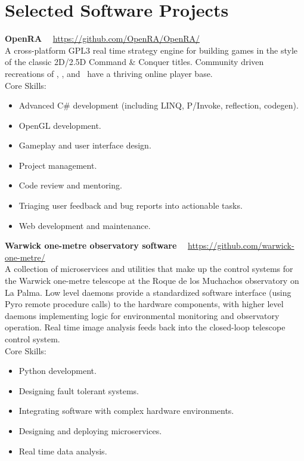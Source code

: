 \documentclass[print]{cv-style}
\begin{document}
\section{Selected Software Projects}

\parbox[t]{12.8cm}{%
    \textbf{OpenRA}%
    \hfill%
    {\small\color{lightgray} \faGithub~~\url{https://github.com/OpenRA/OpenRA/}}\\%
    A cross-platform GPL3 real time strategy engine for building games in the style of the classic 2D/2.5D Command \& Conquer titles.  Community driven recreations of , , and ~have a thriving online player base.
    \vspace{\parsep}\\
    Core Skills:
    \begin{itemize}
        \item Advanced C\# development (including LINQ, P/Invoke, reflection, codegen).
        \item OpenGL development.
        \item Gameplay and user interface design.
        \item Project management.
        \item Code review and mentoring.
        \item Triaging user feedback and bug reports into actionable tasks.
        \item Web development and maintenance.
    \end{itemize}
}

\parbox[t]{12.8cm}{%
    \textbf{Warwick one-metre observatory software}%
    \hfill%
    {\footnotesize\color{lightgray} \faGithub~~\url{https://github.com/warwick-one-metre/}}\\%
    A collection of microservices and utilities that make up the control systems for the Warwick one-metre telescope at the Roque de los Muchachos observatory on La Palma.  Low level daemons provide a standardized software interface (using Pyro remote procedure calls) to the hardware components, with higher level daemons implementing logic for environmental monitoring and observatory operation.  Real time image analysis feeds back into the closed-loop telescope control system.
    \vspace{\parsep}\\
    Core Skills:
    \begin{itemize}
      \item Python development.
      \item Designing fault tolerant systems.
      \item Integrating software with complex hardware environments.
      \item Designing and deploying microservices.
      \item Real time data analysis.
    \end{itemize}
}
\end{document}
